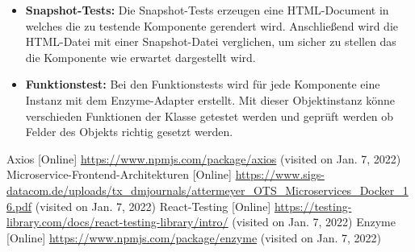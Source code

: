 \documentclass[conference]{IEEEtran}
\begin{document}
\begin{itemize}
    \item \textbf{Snapshot-Tests:}
    Die Snapshot-Tests erzeugen eine HTML-Document in welches die zu testende Komponente gerendert wird.
    Anschließend wird die HTML-Datei mit einer Snapshot-Datei verglichen, um sicher zu stellen das die Komponente wie erwartet dargestellt wird.
    \item \textbf{Funktionstest:}
    Bei den Funktionstests wird für jede Komponente eine Instanz mit dem Enzyme-Adapter erstellt.
    Mit dieser Objektinstanz könne verschieden Funktionen der Klasse getestet werden und geprüft werden ob Felder des Objekts richtig gesetzt werden.
\end{itemize}



\begin{thebibliography}{0}
	Axios [Online] \url{https://www.npmjs.com/package/axios} (visited on Jan. 7, 2022)
    Microservice-Frontend-Architekturen [Online] \url{https://www.sigs-datacom.de/uploads/tx_dmjournals/attermeyer_OTS_Microservices_Docker_16.pdf} (visited on Jan. 7, 2022)
    React-Testing [Online] \url{https://testing-library.com/docs/react-testing-library/intro/} (visited on Jan. 7, 2022)
    Enzyme [Online] \url{https://www.npmjs.com/package/enzyme} (visited on Jan. 7, 2022)  
\end{thebibliography}
\end{document}
